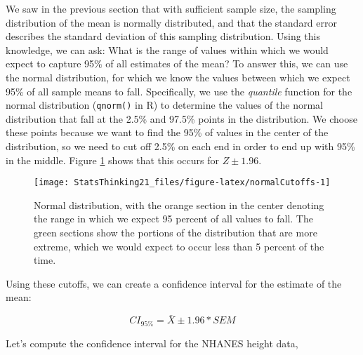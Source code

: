 \documentclass[]{book}
\newenvironment{Shaded}{\begin{snugshade}}{\end{snugshade}}
\newcommand{\KeywordTok}[1]{\textcolor[rgb]{0.13,0.29,0.53}{\textbf{#1}}}
\newcommand{\DataTypeTok}[1]{\textcolor[rgb]{0.13,0.29,0.53}{#1}}
\newcommand{\DecValTok}[1]{\textcolor[rgb]{0.00,0.00,0.81}{#1}}
\newcommand{\FloatTok}[1]{\textcolor[rgb]{0.00,0.00,0.81}{#1}}
\newcommand{\StringTok}[1]{\textcolor[rgb]{0.31,0.60,0.02}{#1}}
\newcommand{\CommentTok}[1]{\textcolor[rgb]{0.56,0.35,0.01}{\textit{#1}}}
\newcommand{\OperatorTok}[1]{\textcolor[rgb]{0.81,0.36,0.00}{\textbf{#1}}}
\newcommand{\NormalTok}[1]{#1}
\theoremstyle{definition}
\theoremstyle{definition}
\theoremstyle{definition}
\theoremstyle{remark}
\begin{document}
We saw in the previous section that with sufficient sample size, the
sampling distribution of the mean is normally distributed, and that the
standard error describes the standard deviation of this sampling
distribution. Using this knowledge, we can ask: What is the range of
values within which we would expect to capture 95\% of all estimates of
the mean? To answer this, we can use the normal distribution, for which
we know the values between which we expect 95\% of all sample means to
fall. Specifically, we use the \emph{quantile} function for the normal
distribution (\texttt{qnorm()} in R) to determine the values of the
normal distribution that fall at the 2.5\% and 97.5\% points in the
distribution. We choose these points because we want to find the 95\% of
values in the center of the distribution, so we need to cut off 2.5\% on
each end in order to end up with 95\% in the middle. Figure
\ref{fig:normalCutoffs} shows that this occurs for \(Z \pm 1.96\).

\begin{figure}
\texttt{[image: StatsThinking21\_files/figure-latex/normalCutoffs-1]} \caption{Normal distribution, with the orange section in the center denoting the range in which we expect 95 percent of all values to fall.  The green sections show the portions of the distribution that are more extreme, which we would expect to occur less than 5 percent of the time.}\label{fig:normalCutoffs}
\end{figure}

Using these cutoffs, we can create a confidence interval for the
estimate of the mean:

\[
CI_{95\%} = \bar{X} \pm 1.96*SEM
\]

Let's compute the confidence interval for the NHANES height data,

\begin{Shaded}
\end{Shaded}
\end{document}

